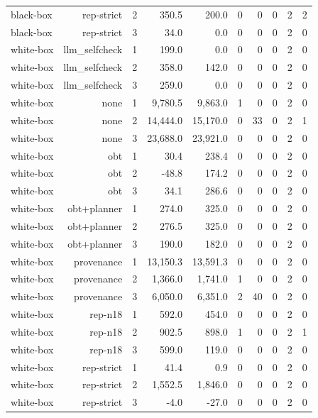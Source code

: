 \begin{table}[t]
\begin{tabular}{lrrrrrrrrr}
black-box & rep-strict & 2 & 350.5 & 200.0 & 0 & 0 & 0 & 2 & 2 \\
black-box & rep-strict & 3 & 34.0 & 0.0 & 0 & 0 & 0 & 2 & 0 \\
white-box & llm\_selfcheck & 1 & 199.0 & 0.0 & 0 & 0 & 0 & 2 & 0 \\
white-box & llm\_selfcheck & 2 & 358.0 & 142.0 & 0 & 0 & 0 & 2 & 0 \\
white-box & llm\_selfcheck & 3 & 259.0 & 0.0 & 0 & 0 & 0 & 2 & 0 \\
white-box & none & 1 & 9,780.5 & 9,863.0 & 1 & 0 & 0 & 2 & 0 \\
white-box & none & 2 & 14,444.0 & 15,170.0 & 0 & 33 & 0 & 2 & 1 \\
white-box & none & 3 & 23,688.0 & 23,921.0 & 0 & 0 & 0 & 2 & 0 \\
white-box & obt & 1 & 30.4 & 238.4 & 0 & 0 & 0 & 2 & 0 \\
white-box & obt & 2 & -48.8 & 174.2 & 0 & 0 & 0 & 2 & 0 \\
white-box & obt & 3 & 34.1 & 286.6 & 0 & 0 & 0 & 2 & 0 \\
white-box & obt+planner & 1 & 274.0 & 325.0 & 0 & 0 & 0 & 2 & 0 \\
white-box & obt+planner & 2 & 276.5 & 325.0 & 0 & 0 & 0 & 2 & 0 \\
white-box & obt+planner & 3 & 190.0 & 182.0 & 0 & 0 & 0 & 2 & 0 \\
white-box & provenance & 1 & 13,150.3 & 13,591.3 & 0 & 0 & 0 & 2 & 0 \\
white-box & provenance & 2 & 1,366.0 & 1,741.0 & 1 & 0 & 0 & 2 & 0 \\
white-box & provenance & 3 & 6,050.0 & 6,351.0 & 2 & 40 & 0 & 2 & 0 \\
white-box & rep-n18 & 1 & 592.0 & 454.0 & 0 & 0 & 0 & 2 & 0 \\
white-box & rep-n18 & 2 & 902.5 & 898.0 & 1 & 0 & 0 & 2 & 1 \\
white-box & rep-n18 & 3 & 599.0 & 119.0 & 0 & 0 & 0 & 2 & 0 \\
white-box & rep-strict & 1 & 41.4 & 0.9 & 0 & 0 & 0 & 2 & 0 \\
white-box & rep-strict & 2 & 1,552.5 & 1,846.0 & 0 & 0 & 0 & 2 & 0 \\
white-box & rep-strict & 3 & -4.0 & -27.0 & 0 & 0 & 0 & 2 & 0 \\
\bottomrule
\end{tabular}
\end{table}
